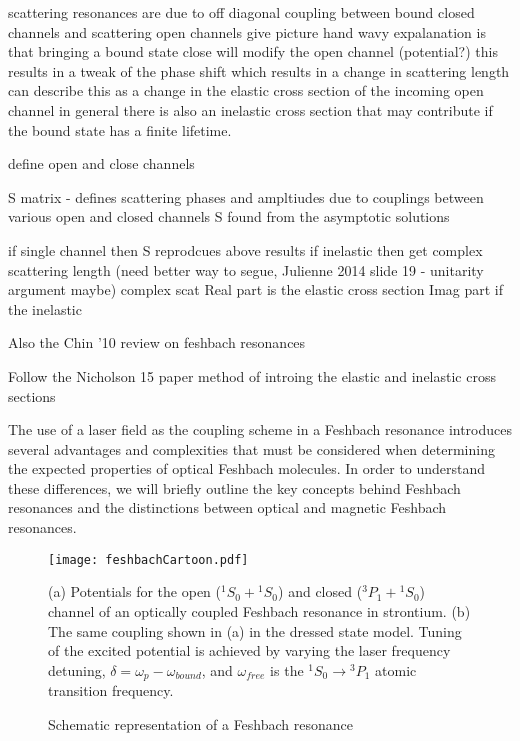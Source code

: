 scattering resonances are due to off diagonal coupling between bound closed channels and scattering open channels
	give picture
hand wavy expalanation is that bringing a bound state close will modify the open channel (potential?)
	this results in a tweak of the phase shift which results in a change in scattering length
can describe this as a change in the elastic cross section of the incoming open channel
in general there is also an inelastic cross section that may contribute if the bound state has a finite lifetime.
	
define open and close channels		

S matrix - defines scattering phases and ampltiudes due to couplings between various open and closed channels
	S found from the asymptotic solutions

if single channel then S reprodcues above results
if inelastic then get complex scattering length (need better way to segue, Julienne 2014 slide 19 - unitarity argument maybe)
complex scat
	Real part is the elastic cross section
	Imag part if the inelastic



Also the Chin '10 review on feshbach resonances

Follow the Nicholson 15 paper method of introing the elastic and inelastic cross sections

The use of a laser field as the coupling scheme in a Feshbach resonance introduces several advantages and complexities that must be considered when determining the expected properties of optical Feshbach molecules. In order to understand these differences, we will briefly outline the key concepts behind Feshbach resonances and the distinctions between optical and magnetic Feshbach resonances.


\begin{figure} \label{fig:FeshbachCartoon}
	\centerline{
	\texttt{[image: feshbachCartoon.pdf]}}
	\caption{Schematic representation of a Feshbach resonance}{(a) Potentials for the open ($^1S_0\!+\!^1S_0$) and closed ($^3P_1\!+\!^1S_0$) channel of an optically coupled Feshbach resonance in strontium. (b) The same coupling shown in (a) in the dressed state model. Tuning of the excited potential is achieved by varying the laser frequency detuning, $\delta = \omega_p - \omega_{bound}$, and $\omega_{free}$ is the $^1S_0\!\rightarrow\!^3P_1$ atomic transition frequency.}
\end{figure} 
	

